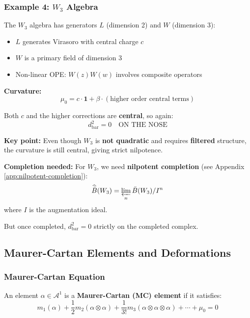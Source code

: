 \subsubsection{Example 4: $W_3$ Algebra}

\begin{example}\label{ex:w3-strict}
The $W_3$ algebra has generators $L$ (dimension 2) and $W$ (dimension 3):
\begin{itemize}
\item $L$ generates Virasoro with central charge $c$
\item $W$ is a primary field of dimension 3
\item Non-linear OPE: $W(z)W(w)$ involves composite operators
\end{itemize}

\textbf{Curvature:}
$$\mu_0 = c \cdot \mathbf{1} + \beta \cdot (\text{higher order central terms})$$

Both $c$ and the higher corrections are \textbf{central}, so again:
$$d_{\text{bar}}^2 = 0 \quad \text{ON THE NOSE}$$

\textbf{Key point:} Even though $W_3$ is \textbf{not quadratic} and requires \textbf{filtered} 
structure, the curvature is still central, giving strict nilpotence.

\textbf{Completion needed:}
For $W_3$, we need \textbf{nilpotent completion} (see Appendix \ref{app:nilpotent-completion}):
$$\widehat{\bar{B}}(W_3) = \varprojlim_n \bar{B}(W_3)/I^n$$
where $I$ is the augmentation ideal.

But once completed, $d_{\text{bar}}^2 = 0$ strictly on the completed complex.
\end{example}

\subsection{Maurer-Cartan Elements and Deformations}

\subsubsection{Maurer-Cartan Equation}

\begin{definition}\label{def:maurer-cartan}
An element $\alpha \in \mathcal{A}^1$ is a \textbf{Maurer-Cartan (MC) element} if it satisfies:
\begin{equation}\label{eq:mc-equation}
m_1(\alpha) + \frac{1}{2} m_2(\alpha \otimes \alpha) + \frac{1}{3!} m_3(\alpha \otimes \alpha 
\otimes \alpha) + \cdots + \mu_0 = 0
\end{equation}
\end{definition}

